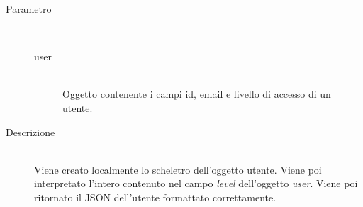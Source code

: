 \begin{description}
\begin{mldescription}
    \hfill
   \begin{description}
    \item[Parametro] \hfill \\
     \begin{description}
      \item[user] \hfill \\
      Oggetto contenente i campi id, email e livello di accesso di un utente.
     \end{description}
    \item[Descrizione] \hfill \\
    Viene creato localmente lo scheletro dell'oggetto utente. Viene poi interpretato l'intero contenuto nel campo \textit{level} dell'oggetto \textit{user}. Viene poi ritornato il JSON dell'utente formattato correttamente.
   \end{description}
   
 \end{mldescription}
 
\end{description}


